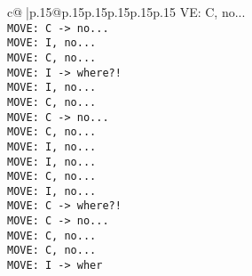 \documentclass{article}
\begin{document}
{\begin{supertabular}{c@{$\;$}|p{.15\linewidth}@{}p{.15\linewidth}p{.15\linewidth}p{.15\linewidth}p{.15\linewidth}p{.15\linewidth}}
{{{VE: C, no...\\ \tt  MOVE: C -> no...\\ \tt  MOVE: I, no...\\ \tt  MOVE: C, no...\\ \tt  MOVE: I -> where?!\\ \tt  MOVE: I, no...\\ \tt  MOVE: C, no...\\ \tt  MOVE: C -> no...\\ \tt  MOVE: C, no...\\ \tt  MOVE: I, no...\\ \tt  MOVE: I, no...\\ \tt  MOVE: C, no...\\ \tt  MOVE: I, no...\\ \tt  MOVE: C -> where?!\\ \tt  MOVE: C -> no...\\ \tt  MOVE: C, no...\\ \tt  MOVE: C, no...\\ \tt  MOVE: I -> wher}}}
\end{supertabular}}
\end{document}
